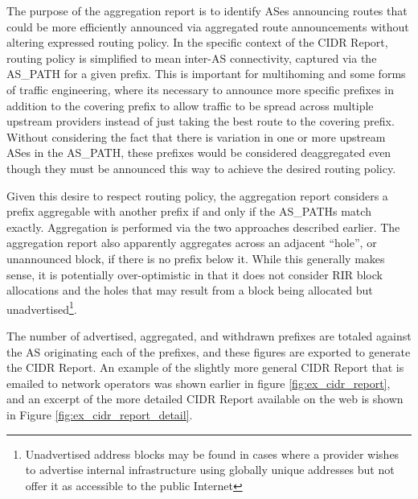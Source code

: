 The purpose of the aggregation report is to identify ASes announcing routes
that could be more efficiently announced via aggregated route announcements
without altering expressed routing policy. In the specific context of the CIDR
Report, routing policy is simplified to mean inter-AS connectivity, captured
via the AS\_PATH for a given prefix. This is important for multihoming and some
forms of traffic engineering, where its necessary to announce more specific
prefixes in addition to the covering prefix to allow traffic to be spread
across multiple upstream providers instead of just taking the best route to the
covering prefix. Without considering the fact that there is variation in one or
more upstream ASes in the AS\_PATH, these prefixes would be considered
deaggregated even though they must be announced this way to achieve the desired
routing policy.

Given this desire to respect routing policy, the aggregation report considers a
prefix aggregable with another prefix if and only if the AS\_PATHs match
exactly. Aggregation is performed via the two approaches described earlier. The
aggregation report also apparently aggregates across an adjacent ``hole'', or
unannounced block, if there is no prefix below it. While this generally makes
sense, it is potentially over-optimistic in that it does not consider RIR block
allocations and the holes that may result from a block being allocated but
unadvertised\footnote{Unadvertised address blocks may be found in cases where a
provider wishes to advertise internal infrastructure using globally unique
addresses but not offer it as accessible to the public Internet}.

The number of advertised, aggregated, and withdrawn prefixes are totaled
against the AS originating each of the prefixes, and these figures are exported
to generate the CIDR Report. An example of the slightly more general CIDR
Report that is emailed to network operators was shown earlier in figure
\ref{fig:ex_cidr_report}, and an excerpt of the more detailed CIDR Report
available on the web is shown in Figure \ref{fig:ex_cidr_report_detail}.

